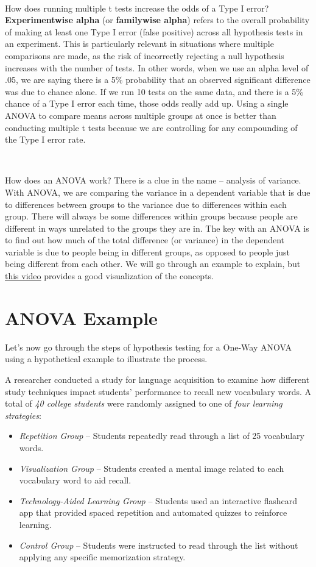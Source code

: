 \documentclass[
  letterpaper,
  DIV=11,
  numbers=noendperiod]{scrreprt}
\begin{document}
\,

How does running multiple t tests increase the odds of a Type I error?
\textbf{Experimentwise alpha} (or \textbf{familywise alpha}) refers to
the overall probability of making at least one Type I error (false
positive) across all hypothesis tests in an experiment. This is
particularly relevant in situations where multiple comparisons are made,
as the risk of incorrectly rejecting a null hypothesis increases with
the number of tests. In other words, when we use an alpha level of .05,
we are saying there is a 5\% probability that an observed significant
difference was due to chance alone. If we run 10 tests on the same data,
and there is a 5\% chance of a Type I error each time, those odds really
add up. Using a single ANOVA to compare means across multiple groups at
once is better than conducting multiple t tests because we are
controlling for any compounding of the Type I error rate.\,\,

\,

How does an ANOVA work? There is a clue in the name -- analysis of
variance. With ANOVA, we are comparing the variance in a dependent
variable that is due to differences between groups to the variance due
to differences within each group. There will always be some differences
within groups because people are different in ways unrelated to the
groups they are in. The key with an ANOVA is to find out how much of the
total difference (or variance) in the dependent variable is due to
people being in different groups, as opposed to people just being
different from each other. We will go through an example to explain, but
\href{https://www.youtube.com/watch?v=ITf4vHhyGpc}{this video} provides
a good visualization of the concepts.\,\,

\section{ANOVA Example}\label{anova-example}

Let's now go through the steps of hypothesis testing for a One-Way ANOVA
using a hypothetical example to illustrate the process.

A researcher conducted a study for language acquisition to examine how
different study techniques impact students' performance to recall new
vocabulary words. A total of \emph{40 college students} were randomly
assigned to one of \emph{four learning strategies}:

\begin{itemize}
\item
  \emph{Repetition Group} -- Students repeatedly read through a list of
  25 vocabulary words.
\item
  \emph{Visualization Group} -- Students created a mental image related
  to each vocabulary word to aid recall.
\item
  \emph{Technology-Aided Learning Group} -- Students used an interactive
  flashcard app that provided spaced repetition and automated quizzes to
  reinforce learning.
\item
  \emph{Control Group} -- Students were instructed to read through the
  list without applying any specific memorization strategy.
\end{itemize}
\end{document}
